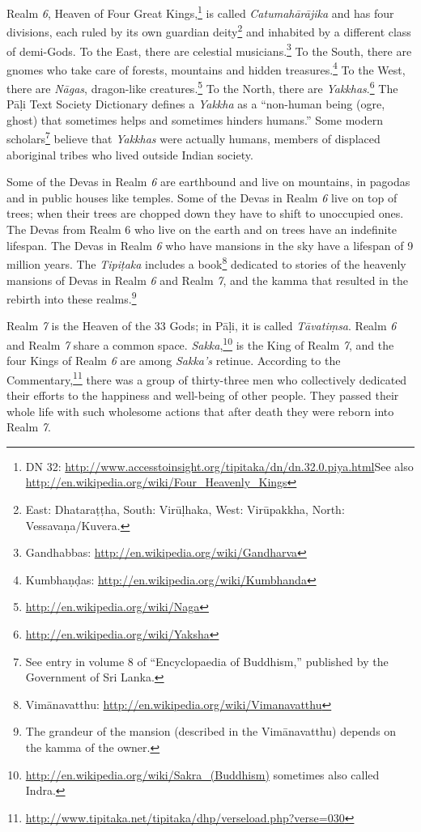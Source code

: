 Realm \textit{6}, Heaven of Four Great Kings,\footnote{DN 32: \url{http://www.accesstoinsight.org/tipitaka/dn/dn.32.0.piya.html}\newline See also \url{http://en.wikipedia.org/wiki/Four_Heavenly_Kings}} is called \textit{Catumahārājika} and has four divisions, each ruled by its own guardian deity\footnote{East: Dhataraṭṭha, South: Virūḷhaka, West: Virūpakkha, North: Vessavaṇa/Kuvera.} and inhabited by a different class of demi-Gods. To the East, there are celestial musicians.\footnote{Gandhabbas: \url{http://en.wikipedia.org/wiki/Gandharva}} To the South, there are gnomes who take care of forests, mountains and hidden treasures.\footnote{Kumbhaṇḍas: \url{http://en.wikipedia.org/wiki/Kumbhanda}} To the West, there are \textit{Nāgas}, dragon-like creatures.\footnote{\url{http://en.wikipedia.org/wiki/Naga}} To the North, there are \textit{Yakkhas}.\footnote{\url{http://en.wikipedia.org/wiki/Yaksha}} The Pāḷi Text Society Dictionary defines a \textit{Yakkha} as a “non-human being (ogre, ghost) that sometimes helps and sometimes hinders humans.” Some modern scholars\footnote{See entry in volume 8 of “Encyclopaedia of Buddhism,” published by the Government of Sri Lanka.} believe that \textit{Yakkhas} were actually humans, members of displaced aboriginal tribes who lived outside Indian society.

Some of the Devas in Realm \textit{6} are earthbound and live on mountains, in pagodas and in public houses like temples. Some of the Devas in Realm \textit{6} live on top of trees; when their trees are chopped down they have to shift to unoccupied ones. The Devas from Realm 6 who live on the earth and on trees have an indefinite lifespan. The Devas in Realm \textit{6} who have mansions in the sky have a lifespan of 9 million years. The \textit{Tipiṭaka} includes a book\footnote{Vimānavatthu: \url{http://en.wikipedia.org/wiki/Vimanavatthu} } dedicated to stories of the heavenly mansions of Devas in Realm \textit{6} and Realm \textit{7}, and the kamma that resulted in the rebirth into these realms.\footnote{The grandeur of the mansion (described in the Vimānavatthu) depends on the kamma of the owner.}

Realm \textit{7} is the Heaven of the 33 Gods; in Pāḷi, it is called \textit{Tāvatiṃsa}. Realm \textit{6} and Realm \textit{7} share a common space. \textit{Sakka},\footnote{\url{http://en.wikipedia.org/wiki/Sakra_(Buddhism)} sometimes also called Indra.} is the King of Realm \textit{7}, and the four Kings of Realm \textit{6} are among \textit{Sakka’s} retinue. According to the Commentary,\footnote{\url{http://www.tipitaka.net/tipitaka/dhp/verseload.php?verse=030}} there was a group of thirty-three men who collectively dedicated their efforts to the happiness and well-being of other people. They passed their whole life with such wholesome actions that after death they were reborn into Realm \textit{7}.


